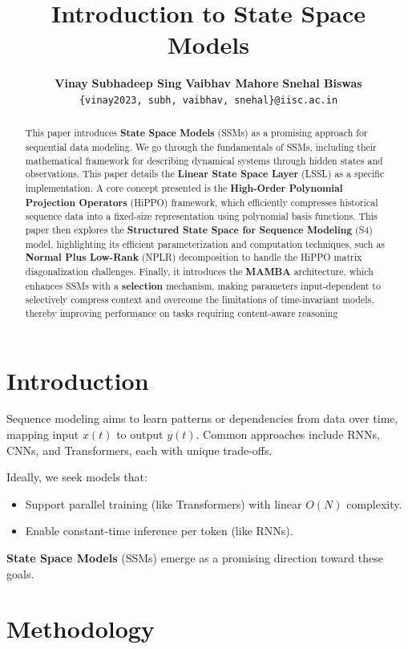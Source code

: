 \documentclass{article}
\title{Introduction to State Space Models}
\author{
\textbf{Vinay}\footnotemark[1] \quad
\textbf{Subhadeep Sing}\footnotemark[1] \quad
\textbf{Vaibhav Mahore}\footnotemark[1] \quad
\textbf{Snehal Biswas}\footnotemark[1] \\
\texttt{\{vinay2023, subh, vaibhav, snehal\}@iisc.ac.in} 
}
\theoremstyle{definition}
\begin{document}
\maketitle
\begin{abstract}
    This paper introduces \textbf{State Space Models} (SSMs) as a promising approach for sequential data modeling. We go through the fundamentals of SSMs, including their mathematical framework for describing dynamical systems through hidden states and observations. This paper details the \textbf{Linear State Space Layer} (LSSL) as a specific implementation. A core concept presented is the \textbf{High-Order Polynomial Projection Operators}  (HiPPO) framework, which efficiently compresses historical sequence data into a fixed-size representation using polynomial basis functions. This paper then explores the \textbf{Structured State Space for Sequence Modeling} (S4) model, highlighting its efficient parameterization and computation techniques, such as \textbf{Normal Plus Low-Rank} (NPLR) decomposition to handle the HiPPO matrix diagonalization challenges. Finally, it introduces the \textbf{MAMBA} architecture, which enhances SSMs with a \textbf{selection} mechanism, making parameters input-dependent to selectively compress context and overcome the limitations of time-invariant models, thereby improving performance on tasks requiring content-aware reasoning
\end{abstract}

\section{Introduction}
Sequence modeling aims to learn patterns or dependencies from data over time, mapping input $x(t)$ to output $y(t)$. Common approaches include RNNs, CNNs, and Transformers, each with unique trade-offs.

Ideally, we seek models that:
\begin{itemize}
    \item Support parallel training (like Transformers) with linear $O(N)$ complexity.
    \item Enable constant-time inference per token (like RNNs).
\end{itemize}

\textbf{State Space Models} (SSMs) emerge as a promising direction toward these goals.



\section{Methodology}
\end{document}
